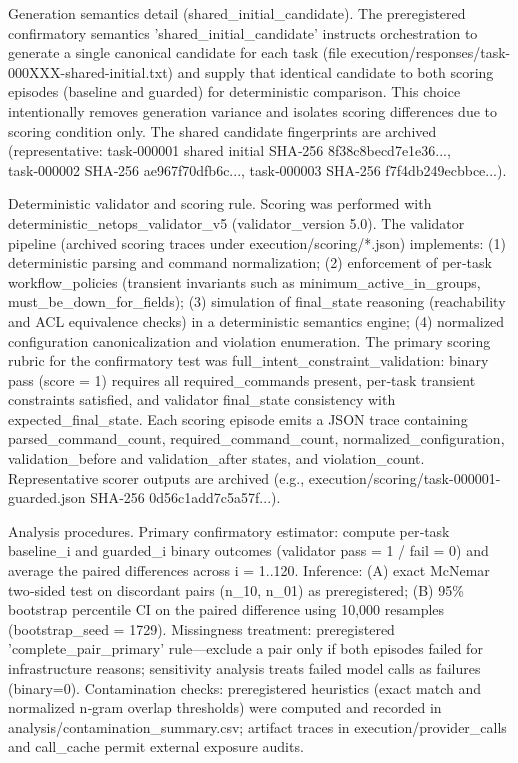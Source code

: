 \documentclass[conference]{IEEEtran}
\begin{document}
Generation semantics detail (shared\_initial\_candidate). The preregistered confirmatory semantics 'shared\_initial\_candidate' instructs orchestration to generate a single canonical candidate for each task (file execution/responses/task-000XXX-shared-initial.txt) and supply that identical candidate to both scoring episodes (baseline and guarded) for deterministic comparison. This choice intentionally removes generation variance and isolates scoring differences due to scoring condition only. The shared candidate fingerprints are archived (representative: task‑000001 shared initial SHA‑256 8f38c8becd7e1e36..., task‑000002 SHA‑256 ae967f70dfb6c..., task‑000003 SHA‑256 f7f4db249ecbbce...).

Deterministic validator and scoring rule. Scoring was performed with deterministic\_netops\_validator\_v5 (validator\_version 5.0). The validator pipeline (archived scoring traces under execution/scoring/*.json) implements: (1) deterministic parsing and command normalization; (2) enforcement of per‑task workflow\_policies (transient invariants such as minimum\_active\_in\_groups, must\_be\_down\_for\_fields); (3) simulation of final\_state reasoning (reachability and ACL equivalence checks) in a deterministic semantics engine; (4) normalized configuration canonicalization and violation enumeration. The primary scoring rubric for the confirmatory test was full\_intent\_constraint\_validation: binary pass (score = 1) requires all required\_commands present, per‑task transient constraints satisfied, and validator final\_state consistency with expected\_final\_state. Each scoring episode emits a JSON trace containing parsed\_command\_count, required\_command\_count, normalized\_configuration, validation\_before and validation\_after states, and violation\_count. Representative scorer outputs are archived (e.g., execution/scoring/task-000001-guarded.json SHA‑256 0d56c1add7c5a57f...).

Analysis procedures. Primary confirmatory estimator: compute per‑task baseline\_i and guarded\_i binary outcomes (validator pass = 1 / fail = 0) and average the paired differences across i = 1..120. Inference: (A) exact McNemar two‑sided test on discordant pairs (n\_10, n\_01) as preregistered; (B) 95\% bootstrap percentile CI on the paired difference using 10,000 resamples (bootstrap\_seed = 1729). Missingness treatment: preregistered 'complete\_pair\_primary' rule---exclude a pair only if both episodes failed for infrastructure reasons; sensitivity analysis treats failed model calls as failures (binary=0). Contamination checks: preregistered heuristics (exact match and normalized n‑gram overlap thresholds) were computed and recorded in analysis/contamination\_summary.csv; artifact traces in execution/provider\_calls and call\_cache permit external exposure audits.
\end{document}
